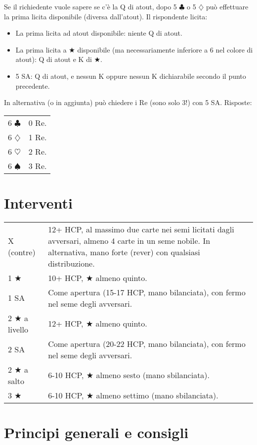 \documentclass[a4paper,10pt]{article}
\renewcommand{\c}{$\clubsuit$\xspace}
\renewcommand{\d}{$\diamondsuit$\xspace}
\newcommand{\h}{$\heartsuit$\xspace}
\newcommand{\s}{$\spadesuit$\xspace}
\renewcommand{\j}{$\bigstar$\xspace}
\newcommand{\sa}{SA\xspace}
\newcommand{\smallspace}{\vskip0.3cm}
\newenvironment{twocol}
  {\smallspace\noindent\begin{tabular}{l p{0.78\textwidth}}}
  {\end{tabular}\smallspace}
\begin{document}
Se il richiedente vuole sapere se c'è la Q di atout, dopo 5 \c o 5 \d può effettuare la prima licita disponibile (diversa dall'atout). Il rispondente licita:

\begin{itemize}
 \item La prima licita ad atout disponibile: niente Q di atout.
 \item La prima licita a \j disponibile (ma necessariamente inferiore a 6 nel colore di atout): Q di atout e K di \j.
 \item 5 \sa: Q di atout, e nessun K oppure nessun K dichiarabile secondo il punto precedente.
\end{itemize}

In alternativa (o in aggiunta) può chiedere i Re (sono solo 3!) con 5 \sa. Risposte:

\begin{twocol}
6 \c & 0 Re.\\
6 \d & 1 Re.\\
6 \h & 2 Re.\\
6 \s & 3 Re.
\end{twocol}

\section{Interventi}

\begin{twocol}
  X (contre) & 12+ HCP, al massimo due carte nei semi licitati dagli avversari, almeno 4 carte in un seme nobile. In alternativa, mano forte (rever) con qualsiasi distribuzione.\\
  1 \j & 10+ HCP, \j almeno quinto.\\
  1 \sa & Come apertura (15-17 HCP, mano bilanciata), con fermo nel seme degli avversari.\\
  2 \j a livello & 12+ HCP, \j almeno quinto.\\
  2 \sa & Come apertura (20-22 HCP, mano bilanciata), con fermo nel seme degli avversari.\\
  2 \j a salto & 6-10 HCP, \j almeno sesto (mano sbilanciata).\\
  3 \j & 6-10 HCP, \j almeno settimo (mano sbilanciata).
\end{twocol}

\pagebreak

\section{Principi generali e consigli}
\end{document}
